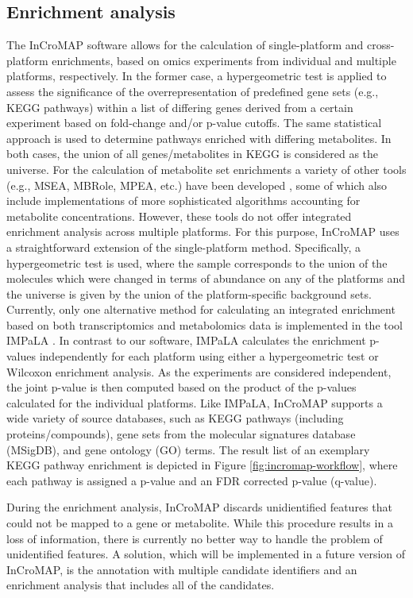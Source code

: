 \documentclass[final,5p,times,twocolumn]{elsarticle}
\newcommand\red[1]{{\color{red}#1}}
\begin{document}
\subsection{Enrichment analysis}
\red{The InCroMAP software allows for the calculation of single-platform and cross-platform enrichments, based on omics experiments from individual and multiple platforms, respectively. In the former case, a hypergeometric test is applied to assess the significance of the overrepresentation of predefined gene sets (e.g., KEGG pathways) within a list of differing genes derived from a certain experiment based on fold-change and/or p-value cutoffs. The same statistical approach is used to determine pathways enriched with differing metabolites. In both cases, the union of all genes/metabolites in KEGG is considered as the universe. For the calculation of metabolite set enrichments a variety of other tools (e.g., MSEA, MBRole, MPEA, etc.) have been developed \cite{Xia2010,Chagoyen2011,Kankainen2011}, some of which also include implementations of more sophisticated algorithms accounting for metabolite concentrations. However, these tools do not offer integrated enrichment analysis across multiple platforms. For this purpose, InCroMAP uses a straightforward extension of the single-platform method. Specifically, a hypergeometric test is used, where the sample corresponds to the union of the molecules which were changed in terms of abundance on any of the platforms and the universe is given by the union of the platform-specific background sets. Currently, only one alternative method for calculating an integrated enrichment based on both transcriptomics and metabolomics data is implemented in the tool IMPaLA \cite{Kamburov2011}. In contrast to our software, IMPaLA calculates the enrichment p-values independently for each platform using either a hypergeometric test or Wilcoxon enrichment analysis. As the experiments are considered independent, the joint p-value is then computed based on the product of the p-values calculated for the individual platforms. Like IMPaLA, InCroMAP supports a wide variety of source databases, such as} KEGG pathways (including proteins/compounds), gene sets from the molecular 
signatures database (MSigDB), and gene ontology (GO) terms. The result list of an exemplary KEGG pathway enrichment is depicted in Figure \ref{fig:incromap-workflow}, where each pathway is assigned a p-value and an FDR corrected p-value (q-value).

During the enrichment analysis, InCroMAP discards unidientified features that could not be mapped to a gene or metabolite. While this procedure results in a loss of information, there is currently no better way to handle the problem of unidentified features. A solution, which will be implemented in a future version of InCroMAP, is the annotation with multiple candidate identifiers and an enrichment analysis that includes all of the candidates.
\end{document}
